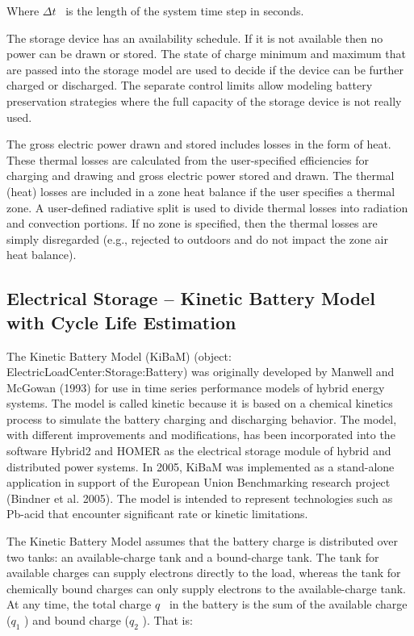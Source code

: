 Where \(\Delta t\) ~is the length of the system time step in seconds.

The storage device has an availability schedule. If it is not available then no power can be drawn or stored.  The state of charge minimum and maximum that are passed into the storage model are used to decide if the device can be further charged or discharged.  The separate control limits allow modeling battery preservation strategies where the full capacity of the storage device is not really used. 

The gross electric power drawn and stored includes losses in the form of heat. These thermal losses are calculated from the user-specified efficiencies for charging and drawing and gross electric power stored and drawn. The thermal (heat) losses are included in a zone heat balance if the user specifies a thermal zone. A user-defined radiative split is used to divide thermal losses into radiation and convection portions. If no zone is specified, then the thermal losses are simply disregarded (e.g., rejected to outdoors and do not impact the zone air heat balance).

\subsection{Electrical Storage -- Kinetic Battery Model with Cycle Life Estimation}\label{electrical-storage-kinetic-battery-model}

The Kinetic Battery Model (KiBaM) (object: ElectricLoadCenter:Storage:Battery) was originally developed by Manwell and McGowan (1993) for use in time series performance models of hybrid energy systems. The model is called kinetic because it is based on a chemical kinetics process to simulate the battery charging and discharging behavior. The model, with different improvements and modifications, has been incorporated into the software Hybrid2 and HOMER as the electrical storage module of hybrid and distributed power systems. In 2005, KiBaM was implemented as a stand-alone application in support of the European Union Benchmarking research project (Bindner et al. 2005). The model is intended to represent technologies such as Pb-acid that encounter significant rate or kinetic limitations.

The Kinetic Battery Model assumes that the battery charge is distributed over two tanks: an available-charge tank and a bound-charge tank. The tank for available charges can supply electrons directly to the load, whereas the tank for chemically bound charges can only supply electrons to the available-charge tank. At any time, the total charge \(q\) ~in the battery is the sum of the available charge (\({q_1}\) ) and bound charge (\({q_2}\) ). That is:

